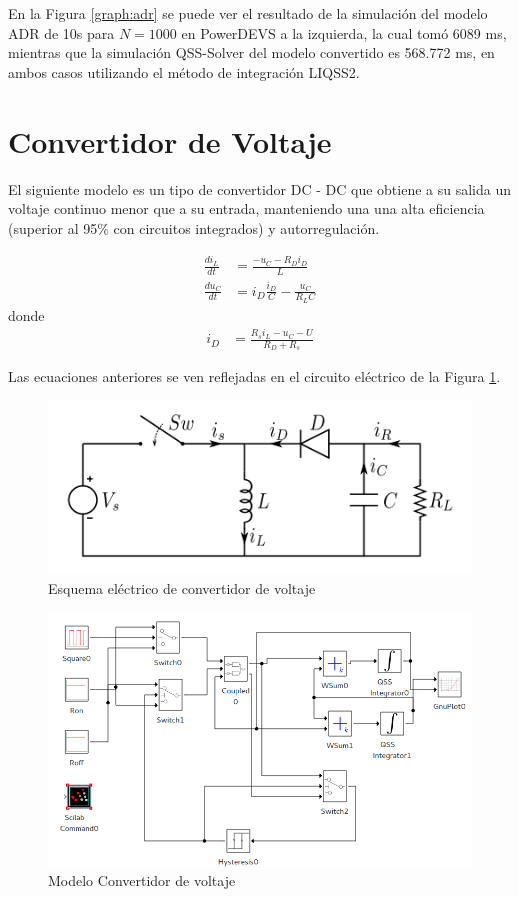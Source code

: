 En la Figura \ref{graph:adr} se puede ver el resultado de la simulación del modelo ADR de 10s para $N=1000$ en PowerDEVS a la izquierda, la cual tomó 6089 ms,
mientras que la simulación QSS-Solver del modelo convertido es 568.772 ms, en ambos casos utilizando el método de integración LIQSS2.

\section{Convertidor de Voltaje}
	El siguiente modelo es un tipo de convertidor DC - DC que obtiene a su  salida  un  voltaje  continuo  menor  que  a  su entrada, manteniendo una una  alta eficiencia (superior al 95\% con circuitos integrados) y autorregulación.

\begin{align*}
\frac{di_{L}}{dt} & = \frac{-u_{C} - R_D i_D }{L}\\
\frac{du_C}{dt} & =i_D \frac{i_D}{C} - \frac{u_C}{R_L C }
\end{align*}
donde
\begin{align*}
i_D & = \frac{R_s i_L - u_C - U }{R_D + R_s}
\end{align*}

Las ecuaciones anteriores se ven reflejadas en el circuito eléctrico de la Figura \ref{buckdisk-squema}.

\begin{figure}[H]
\centering
 \includegraphics[width=.60\linewidth]{Buckboost_conventions}
 \caption{Esquema eléctrico de convertidor de voltaje}\label{buckdisk-squema}
\end{figure}


\begin{figure}[H]
\includegraphics[width=0.75\linewidth]{buck_disk}
\caption{Modelo Convertidor de voltaje}\label{model:buckdisk}
\end{figure}

